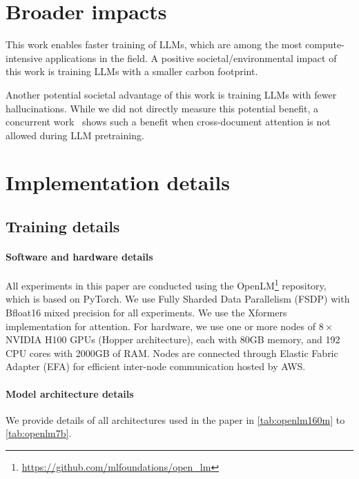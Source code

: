 \appendix

\section{Broader impacts}\label{app:broader_impact}
This work enables faster training of LLMs, which are among the most compute-intensive applications in the field. A positive societal/environmental impact of this work is training LLMs with a smaller carbon footprint.

Another potential societal advantage of this work is training LLMs with fewer hallucinations. While we did not directly measure this potential benefit, a concurrent work~\citep{ding2024fewer} shows such a benefit when cross-document attention is not allowed during LLM pretraining.

\section{Implementation details} \label{sec:impl_details}
\subsection{Training details}\label{cc}
\paragraph{Software and hardware details} All experiments in this paper are conducted using the OpenLM\footnote{\url{https://github.com/mlfoundations/open_lm}} repository, which is based on PyTorch. We use Fully Sharded Data Parallelism (FSDP) with Bfloat16 mixed precision for all experiments. We use the Xformers~\citep{xFormers2022} implementation for attention. For hardware, we use one or more nodes of $8\times$ NVIDIA H100 GPUs (Hopper architecture), each with 80GB memory, and 192 CPU cores with 2000GB of RAM. Nodes are connected through Elastic Fabric Adapter (EFA) for efficient inter-node communication hosted by AWS.


\paragraph{Model architecture details}
We provide details of all architectures used in the paper in \cref{tab:openlm160m} to \cref{tab:openlm7b}.
\begin{figure}[h]
    \begin{minipage}{0.49\textwidth}
         
         \label{tab:openlm160m}
    \end{minipage}
    \hfill
    \begin{minipage}{0.49\textwidth}
         
         \label{tab:openlm410m}
    \end{minipage}
\end{figure}

